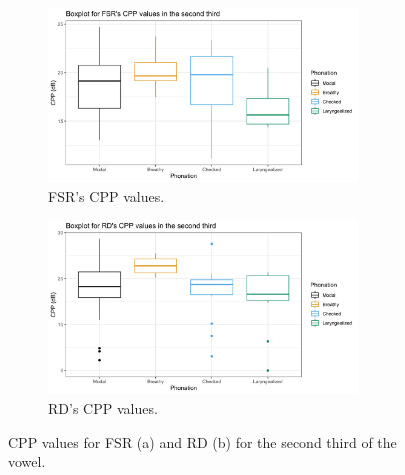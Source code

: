 \documentclass[12pt, letterpaper]{article}
\begin{document}
\begin{figure}[!ht]
	\centering
	\begin{subfigure}{.5\textwidth}
		\centering
		\includegraphics[width=0.9\textwidth]{Images/mean_FSR_cpp_Second.png}
		\caption{FSR's CPP values.}
		\label{fig:FSRcppsecond} 
	\end{subfigure}%
	\begin{subfigure}{.5\textwidth}
		\centering
		\includegraphics[width=0.9\textwidth]{Images/mean_RD_cpp_Second.png}
		\caption{RD's CPP values.}
		\label{fig:RDcppsecond} 
	\end{subfigure}
	\caption{CPP values for FSR (a) and RD (b) for the second third of the vowel. }
	\label{fig:cppsecond}
\end{figure}
\end{document}
